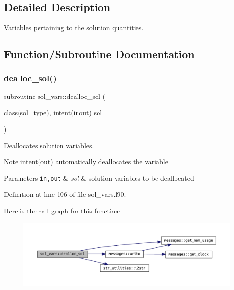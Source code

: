 \subsection{Detailed Description}
Variables pertaining to the solution quantities. 

\subsection{Function/\+Subroutine Documentation}
\mbox{\label{namespacesol__vars_a9ae65a5252aede548e5238e50c1bb2ba}} 
\subsubsection{\texorpdfstring{dealloc\+\_\+sol()}{dealloc\_sol()}}
{\footnotesize\ttfamily subroutine sol\+\_\+vars\+::dealloc\+\_\+sol (\begin{DoxyParamCaption}\item[{class(\hyperlink{structsol__vars_1_1sol__type}{sol\+\_\+type}), intent(inout)}]{sol }\end{DoxyParamCaption})}



Deallocates solution variables. 

\begin{DoxyNote}{Note}
intent(out) automatically deallocates the variable
\end{DoxyNote}

\begin{DoxyParams}[1]{Parameters}
\mbox{\tt in,out}  & {\em sol} & solution variables to be deallocated \\
\hline
\end{DoxyParams}


Definition at line 106 of file sol\+\_\+vars.\+f90.

Here is the call graph for this function\+:\nopagebreak
\begin{figure}[H]
\begin{center}
\leavevmode
\includegraphics[width=350pt]{namespacesol__vars_a9ae65a5252aede548e5238e50c1bb2ba_cgraph}
\end{center}
\end{figure}
\mbox{\label{namespacesol__vars_a05d1378774a44f53c9643bdacc5bee4a}} 
